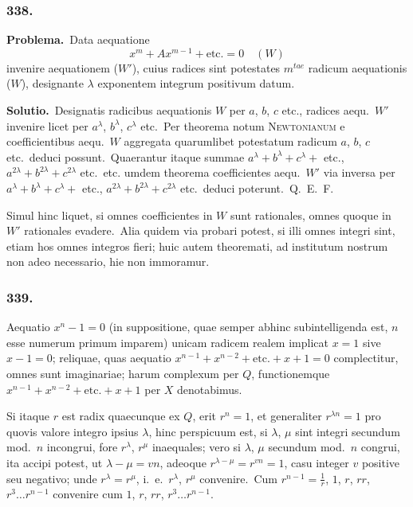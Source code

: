 \documentclass[12pt,a4paper]{article}
\theoremstyle{plain}
\theoremstyle{definition}
\theoremstyle{remark}
\begin{document}
\subsubsection*{338.}

\textbf{Problema.}\ Data aequatione
\[x^m + Ax^{m-1} + \text{etc.} = 0\quad (W)\]
invenire aequationem ($W'$), cuius radices sint potestates $m^{tae}$ radicum
aequationis ($W$), designante $\lambda$ exponentem integrum positivum datum.

\textbf{Solutio.}\ Designatis radicibus aequationis $W$ per $a$, $b$, $c$ etc.,
radices aequ.\ $W'$ invenire licet per $a^\lambda$, $b^\lambda$, $c^\lambda$ etc.\ Per theorema
notum \textsc{Newtonianum} e coefficientibus aequ.\ $W$ aggregata quarumlibet
potestatum radicum $a$, $b$, $c$ etc.\ deduci possunt.\ Quaerantur itaque
summae $a^\lambda+b^\lambda+c^\lambda+$ etc., $a^{2\lambda}+b^{2\lambda}+c^{2\lambda}$ etc.\ etc.
umdem theorema coefficientes aequ.\ $W'$ via inversa per $a^\lambda+b^\lambda+c^\lambda+$
etc., $a^{2\lambda}+b^{2\lambda}+c^{2\lambda}$ etc.\ deduci poterunt.\ Q.\ E.\ F.

Simul hinc liquet, si omnes coefficientes in $W$ sunt rationales, omnes
quoque in $W'$ rationales evadere.\ Alia quidem via probari potest, si illi
omnes integri sint, etiam hos omnes integros fieri; huic autem theoremati,
ad institutum nostrum non adeo necessario, hie non immoramur.

\subsubsection*{339.}

Aequatio $x^n-1=0$ (in suppositione, quae semper abhinc
subintelligenda est, $n$ esse numerum primum imparem) unicam radicem
realem implicat $x=1$ sive $x-1=0$; reliquae, quas aequatio
$x^{n-1}+x^{n-2}+\text{etc.}+x+1=0$ complectitur, omnes sunt imaginariae;
harum complexum per $Q$, functionemque $x^{n-1}+x^{n-2}+\text{etc.}+x+1$
per $X$ denotabimus.

Si itaque $r$ est radix quaecunque ex $Q$, erit $r^n=1$, et generaliter
$r^{\lambda n}=1$ pro quovis valore integro ipsius $\lambda$, hinc perspicuum est, si
$\lambda$, $\mu$ sint integri secundum mod.\ $n$ incongrui, fore $r^\lambda$, $r^\mu$ inaequales;
vero si $\lambda$, $\mu$ secundum mod.\ $n$ congrui, ita accipi potest, ut
$\lambda-\mu = vn$, adeoque $r^{\lambda-\mu} = r^{vn} = 1$, casu integer $v$ positive seu
negativo; unde $r^\lambda = r^\mu$, i.\ e.\ $r^\lambda$, $r^\mu$ convenire.\ Cum $r^{n-1} = \frac{1}{r}$,
$1$, $r$, $rr$, $r^3\dots r^{n-1}$ convenire cum $1$, $r$, $rr$, $r^3\dots r^{n-1}$.
\end{document}

